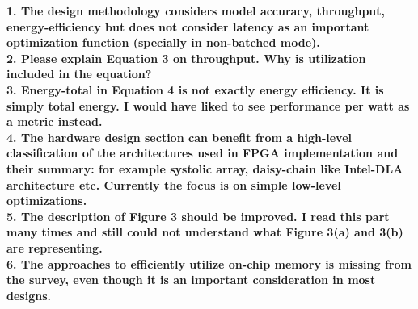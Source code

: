 \documentclass[12pt]{paper}
\newcommand{\comment}[1]{\noindent\textbf{#1}\\}
\begin{document}
\comment{1.	The design methodology considers model accuracy, throughput, energy-efficiency but does not consider latency as an important optimization function (specially in non-batched mode).}

\comment{2.	Please explain Equation 3 on throughput. Why is utilization included in the equation?}

\comment{3.	Energy-total in Equation 4 is not exactly energy efficiency. It is simply total energy. I would have liked to see performance per watt as a metric instead.}

\comment{4.	The hardware design section can benefit from a high-level classification of the architectures used in FPGA implementation and their summary: for example systolic array, daisy-chain like Intel-DLA architecture etc. Currently the focus is on simple low-level optimizations.}

\comment{5.	The description of Figure 3 should be improved. I read this part many times and still could not understand what Figure 3(a) and 3(b) are representing.}

\comment{6.	The approaches to efficiently utilize on-chip memory is missing from the survey, even though it is an important consideration in most designs.}
\end{document}
